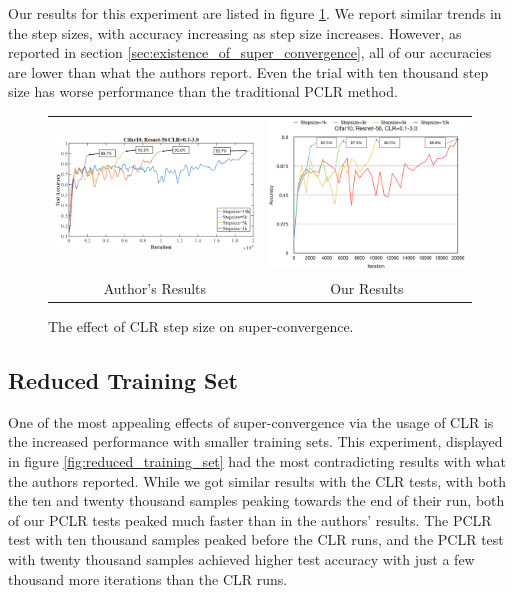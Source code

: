 \documentclass[10pt,twocolumn,letterpaper]{article}
\begin{document}
Our results for this experiment are listed in figure \ref{fig:step_size}. We
report similar trends in the step sizes, with accuracy increasing as step size
increases. However, as reported in section
\ref{sec:existence_of_super_convergence}, all of our accuracies are lower than
what the authors report. Even the trial with ten thousand step size has worse
performance than the traditional PCLR method.

\begin{figure}[ht!]
    \begin{tabular}{cc}
        \includegraphics[trim=0 0 0 0, clip,
            width=3.25in]{images/figure_1b.png} &
        \includegraphics[trim=0 0 0 0, clip,
            width=3.25in]{images/step_sizes.png} \\
        Author's Results & Our Results \\
    \end{tabular}
    \caption{The effect of CLR step size on super-convergence.}
    \label{fig:step_size}
\end{figure}

\subsection{Reduced Training Set}
One of the most appealing effects of super-convergence via the usage of CLR is
the increased performance with smaller training sets. This experiment,
displayed in figure \ref{fig:reduced_training_set} had the most contradicting
results with what the authors reported. While we got similar results with the
CLR tests, with both the ten and twenty thousand samples peaking towards the
end of their run, both of our PCLR tests peaked much faster than in the
authors' results. The PCLR test with ten thousand samples peaked before the CLR
runs, and the PCLR test with twenty thousand samples achieved higher test
accuracy with just a few thousand more iterations than the CLR runs.
\end{document}
